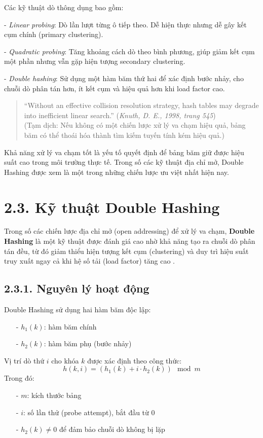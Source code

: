 \documentclass[12pt,a4paper]{report}
\begin{document}
Các kỹ thuật dò thông dụng bao gồm:

- \textit{Linear probing}: Dò lần lượt từng ô tiếp theo. Dễ hiện thực nhưng dễ gây kết cụm chính (primary clustering).

- \textit{Quadratic probing}: Tăng khoảng cách dò theo bình phương, giúp giảm kết cụm một phần nhưng vẫn gặp hiện tượng secondary clustering.

- \textit{Double hashing}: Sử dụng một hàm băm thứ hai để xác định bước nhảy, cho chuỗi dò phân tán hơn, ít kết cụm và hiệu quả hơn khi load factor cao.
\begin{quote}
“Without an effective collision resolution strategy, hash tables may degrade into inefficient linear search.”
(\textit{Knuth, D. E., 1998, trang 545}) \\
(Tạm dịch: Nếu không có một chiến lược xử lý va chạm hiệu quả, bảng băm có thể thoái hóa thành tìm kiếm tuyến tính kém hiệu quả.)
\end{quote}
\noindent \indent Khả năng xử lý va chạm tốt là yếu tố quyết định để bảng băm giữ được hiệu suất cao trong môi trường thực tế. Trong số các kỹ thuật địa chỉ mở, Double Hashing được xem là một trong những chiến lược ưu việt nhất hiện nay.

\section*{2.3. Kỹ thuật Double Hashing}
\noindent \indent Trong số các chiến lược địa chỉ mở (open addressing) để xử lý va chạm, \textbf{Double Hashing} là một kỹ thuật được đánh giá cao nhờ khả năng tạo ra chuỗi dò phân tán đều, từ đó giảm thiểu hiện tượng kết cụm (clustering) và duy trì hiệu suất truy xuất ngay cả khi hệ số tải (load factor) tăng cao \cite{cormen2009}.
\subsection*{2.3.1. Nguyên lý hoạt động}
\noindent \indent Double Hashing sử dụng hai hàm băm độc lập:
\begin{itemize}
    \item[-] $h_1(k)$: hàm băm chính
    \item[-] $h_2(k)$: hàm băm phụ (bước nhảy)
\end{itemize}

Vị trí dò thứ $i$ cho khóa $k$ được xác định theo công thức:
\[
h(k, i) = \left( h_1(k) + i \cdot h_2(k) \right) \mod m
\]
\noindent \indent Trong đó:
\begin{itemize}
    \item[-] $m$: kích thước bảng
    \item[-] $i$: số lần thử (probe attempt), bắt đầu từ $0$
    \item[-] $h_2(k) \neq 0$ để đảm bảo chuỗi dò không bị lặp
\end{itemize}
\end{document}
